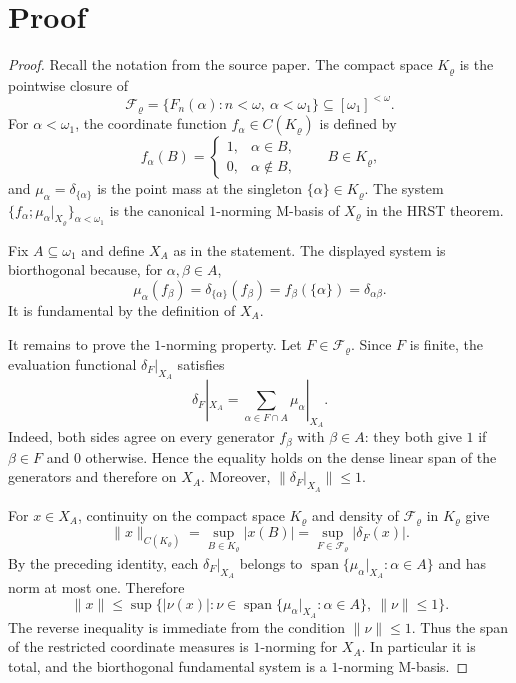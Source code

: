 \documentclass[11pt]{article}
\newcommand{\spn}{\operatorname{span}}
\newcommand{\Krho}{K_\varrho}
\newcommand{\Frho}{\mathcal F_\varrho}
\newcommand{\Xrho}{X_\varrho}
\begin{document}
\section*{Proof}

\begin{proof}
Recall the notation from the source paper. The compact space $\Krho$ is the
pointwise closure of
\[
    \Frho=\{F_n(\alpha):n<\omega,\ \alpha<\omega_1\}
    \subseteq [\omega_1]^{<\omega}.
\]
For $\alpha<\omega_1$, the coordinate function $f_\alpha\in C(\Krho)$ is
defined by
\[
    f_\alpha(B)=
    \begin{cases}
    1, & \alpha\in B,\\
    0, & \alpha\notin B,
    \end{cases}
    \qquad B\in\Krho,
\]
and $\mu_\alpha=\delta_{\{\alpha\}}$ is the point mass at the singleton
$\{\alpha\}\in\Krho$. The system
$\{f_\alpha;\mu_\alpha|_{\Xrho}\}_{\alpha<\omega_1}$ is the canonical
$1$-norming M-basis of $\Xrho$ in the HRST theorem.

Fix $A\subseteq\omega_1$ and define $X_A$ as in the statement. The displayed
system is biorthogonal because, for $\alpha,\beta\in A$,
\[
    \mu_\alpha(f_\beta)=\delta_{\{\alpha\}}(f_\beta)=f_\beta(\{\alpha\})
    =\delta_{\alpha\beta}.
\]
It is fundamental by the definition of $X_A$.

It remains to prove the $1$-norming property. Let $F\in\Frho$. Since $F$ is
finite, the evaluation functional $\delta_F|_{X_A}$ satisfies
\[
    \delta_F|_{X_A}
      =
    \sum_{\alpha\in F\cap A}\mu_\alpha|_{X_A}.
\]
Indeed, both sides agree on every generator $f_\beta$ with $\beta\in A$:
they both give $1$ if $\beta\in F$ and $0$ otherwise. Hence the equality
holds on the dense linear span of the generators and therefore on $X_A$.
Moreover, $\|\delta_F|_{X_A}\|\le 1$.

For $x\in X_A$, continuity on the compact space $\Krho$ and density of
$\Frho$ in $\Krho$ give
\[
    \|x\|_{C(\Krho)}
      =
    \sup_{B\in\Krho}|x(B)|
      =
    \sup_{F\in\Frho}|\delta_F(x)|.
\]
By the preceding identity, each $\delta_F|_{X_A}$ belongs to
$\spn\{\mu_\alpha|_{X_A}:\alpha\in A\}$ and has norm at most one. Therefore
\[
    \|x\|
    \le
    \sup\Big\{
        |\nu(x)|:\nu\in\spn\{\mu_\alpha|_{X_A}:\alpha\in A\},
        \ \|\nu\|\le 1
    \Big\}.
\]
The reverse inequality is immediate from the condition $\|\nu\|\le1$.
Thus the span of the restricted coordinate measures is $1$-norming for
$X_A$. In particular it is total, and the biorthogonal fundamental system is
a $1$-norming M-basis.
\end{proof}
\end{document}

